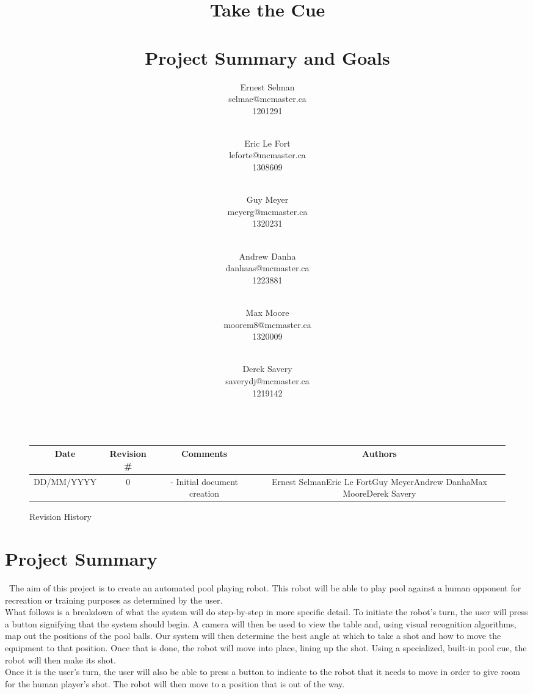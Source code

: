 \documentclass[titlepage]{article}
\date{}				%
\title{\textbf{Take the Cue\\~\\Project Summary and Goals}}
\author{
Ernest Selman\\selmae@mcmaster.ca\\1201291\\~\\\and
Eric Le Fort\\leforte@mcmaster.ca\\1308609\\~\\\and
Guy Meyer\\meyerg@mcmaster.ca\\1320231\\~\\\and
Andrew Danha\\danhaas@mcmaster.ca\\1223881\\~\\\and
Max Moore\\moorem8@mcmaster.ca\\1320009\\~\\\and
Derek Savery\\saverydj@mcmaster.ca\\1219142\\~\\
}
\begin{document}
\maketitle

\tableofcontents
\listoffigures

\vfill
\begin{figure}[!htbp]
\centering
\begin{tabular}{| C{3} | C{2} | C{5} | C{2.5} |}\hline
	Date			&Revision \#	&Comments						&Authors\\\hline
	DD/MM/YYYY		&0				&- Initial document creation	&Ernest Selman\newline Eric Le Fort\newline Guy Meyer\newline Andrew Danha\newline Max Moore\newline Derek Savery\\\hline
\end{tabular}
\caption{Revision History}
\end{figure}
\newpage


\section{Project Summary}
~\indent The aim of this project is to create an automated pool playing robot. This robot will be able to play pool against a human opponent for recreation or training purposes as determined by the user.\\

What follows is a breakdown of what the system will do step-by-step in more specific detail. To initiate the robot's turn, the user will press a button signifying that the system should begin. A camera will then be used to view the table and, using visual recognition algorithms, map out the positions of the pool balls. Our system will then determine the best angle at which to take a shot and how to move the equipment to that position. Once that is done, the robot will move into place, lining up the shot. Using a specialized, built-in pool cue, the robot will then make its shot.\\

Once it is the user's turn, the user will also be able to press a button to indicate to the robot that it needs to move in order to give room for the human player's shot. The robot will then move to a position that is out of the way.
\end{document}
